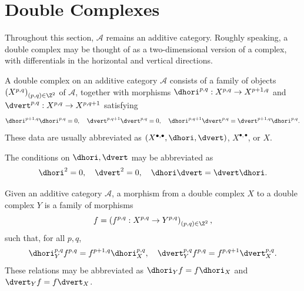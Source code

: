 
\section{Double Complexes}\label{sec:double-cplx}
\hypertarget{o014.aljabr2.chapter3.double-complexes}{ }

Throughout this section, $\mathcal{A}$ remains an additive category. Roughly
speaking, a double complex may be thought of as a two-dimensional version of
a complex, with differentials in the horizontal and vertical directions.

\begin{definition}\label{def:double-cplx}
	A double complex on an additive category $\mathcal{A}$ consists of a
	family of objects $\left(X^{p,q}\right)_{(p,q)\in\Z^2}$ of
	$\mathcal{A}$, together with morphisms
	$\dhori^{p,q}:X^{p,q}\to X^{p+1,q}$ and
	$\dvert^{p,q}:X^{p,q}\to X^{p,q+1}$ satisfying
	\[ \dhori^{p+1,q} \dhori^{p,q} = 0, \quad \dvert^{p, q+1} \dvert^{p,q} = 0, \quad \dhori^{p, q+1} \dvert^{p,q} = \dvert^{p+1, q} \dhori^{p,q}. \]
	These data are usually abbreviated as
	$(X^{\bullet,\bullet},\dhori,\dvert)$, $X^{\bullet,\bullet}$, or $X$.
\end{definition}

The conditions on $\dhori,\dvert$ may be abbreviated as
\[ \dhori^2 = 0, \quad \dvert^2 = 0, \quad \dhori \dvert = \dvert \dhori. \]

\begin{definition}\label{def:bicplx}
	Given an additive category $\mathcal{A}$, a morphism from a double complex
	$X$ to a double complex $Y$ is a family of morphisms
	\[ f = \left( f^{p,q}: X^{p, q} \to Y^{p, q} \right)_{(p, q) \in \Z^2}, \]
	such that, for all $p,q$,
	\[ \dhori_Y^{p, q} f^{p, q} = f^{p+1, q} \dhori_X^{p, q}, \quad \dvert_Y^{p, q} f^{p, q} = f^{p, q+1} \dvert_X^{p, q}. \]
	These relations may be abbreviated as $\dhori_Yf=f\dhori_X$ and
	$\dvert_Yf=f\dvert_X$.
\end{definition}

